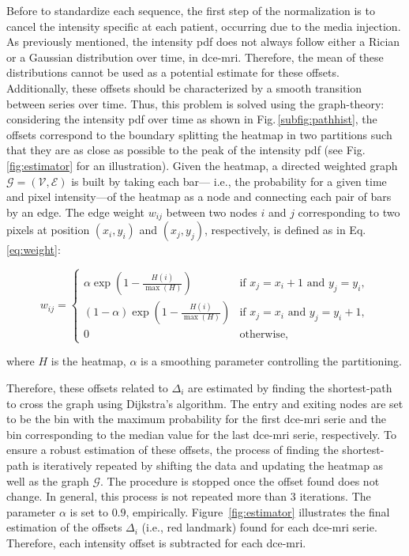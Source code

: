 Before to standardize each sequence, the first step of the normalization is to cancel the intensity specific at each patient, occurring due to the media injection.
As previously mentioned, the intensity \ac{pdf} does not always follow either a Rician or a Gaussian distribution over time, in \ac{dce}-\ac{mri}.
Therefore, the mean of these distributions cannot be used as a potential estimate for these offsets.
Additionally, these offsets should be characterized by a smooth transition between series over time.
Thus, this problem is solved using the graph-theory: considering the intensity \ac{pdf} over time as shown in Fig.\,\ref{subfig:pathhist}, the offsets correspond to the boundary splitting the heatmap in two partitions such that they are as close as possible to the peak of the intensity \ac{pdf} (see Fig.\,\ref{fig:estimator} for an illustration).
Given the heatmap, a directed weighted graph $\mathcal{G}=(\mathcal{V}, \mathcal{E})$ is built by taking each bar--- i.e., the probability for a given time and pixel intensity---of the heatmap as a node and connecting each pair of bars by an edge.
The edge weight $w_{ij}$ between two nodes $i$ and $j$ corresponding to two pixels at position $(x_i, y_i)$ and $(x_j, y_j)$, respectively, is defined as in Eq.\,\eqref{eq:weight}:

\begin{equation}
  w_{ij} = \begin{cases}
    \alpha \exp(1 - \frac{H(i)}{\max(H)})       & \text{if } x_j = x_i + 1 \text{ and } y_j = y_i, \\
    (1 - \alpha) \exp(1 - \frac{H(i)}{\max(H)}) & \text{if } x_j = x_i \text{ and } y_j = y_i + 1, \\
    0                                           & \text{otherwise},
  \end{cases}
  \label{eq:weight}
\end{equation}

\noindent where $H$ is the heatmap, $\alpha$ is a smoothing parameter controlling the partitioning.

Therefore, these offsets related to $\Delta_i$ are estimated by finding the shortest-path to cross the graph using Dijkstra's algorithm.
The entry and exiting nodes are set to be the bin with the maximum probability for the first \ac{dce}-\ac{mri} serie and the bin corresponding to the median value for the last \ac{dce}-\ac{mri} serie, respectively.
To ensure a robust estimation of these offsets, the process of finding the shortest-path is iteratively repeated by shifting the data and updating the heatmap as well as the graph $\mathcal{G}$.
The procedure is stopped once the offset found does not change.
In general, this process is not repeated more than 3 iterations.
The parameter $\alpha$ is set to $0.9$, empirically.
Figure~\ref{fig:estimator} illustrates the final estimation of the offsets $\Delta_i$ (i.e., red landmark) found for each \ac{dce}-\ac{mri} serie.
Therefore, each intensity offset is subtracted for each \ac{dce}-\ac{mri}.

